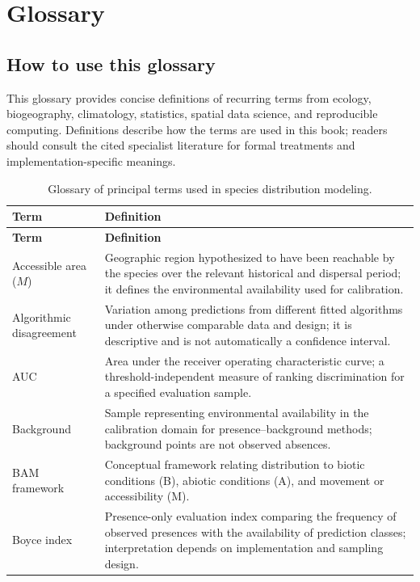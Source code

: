 \chapter{Glossary}

\section*{How to use this glossary}

This glossary provides concise definitions of recurring terms from ecology, biogeography, climatology, statistics, spatial data science, and reproducible computing. Definitions describe how the terms are used in this book; readers should consult the cited specialist literature for formal treatments and implementation-specific meanings.

\begin{longtable}{p{}p{}}
\caption{Glossary of principal terms used in species distribution modeling.}
\label{tab:glossario_sdm}\\
\toprule
\textbf{Term} & \textbf{Definition} \\
\midrule
\endfirsthead
\toprule
\textbf{Term} & \textbf{Definition} \\
\midrule
\endhead
Accessible area (\(M\)) & Geographic region hypothesized to have been reachable by the species over the relevant historical and dispersal period; it defines the environmental availability used for calibration. \\
Algorithmic disagreement & Variation among predictions from different fitted algorithms under otherwise comparable data and design; it is descriptive and is not automatically a confidence interval. \\
AUC & Area under the receiver operating characteristic curve; a threshold-independent measure of ranking discrimination for a specified evaluation sample. \\
Background & Sample representing environmental availability in the calibration domain for presence--background methods; background points are not observed absences. \\
BAM framework & Conceptual framework relating distribution to biotic conditions (B), abiotic conditions (A), and movement or accessibility (M). \\
Boyce index & Presence-only evaluation index comparing the frequency of observed presences with the availability of prediction classes; interpretation depends on implementation and sampling design. \\

\end{longtable}
